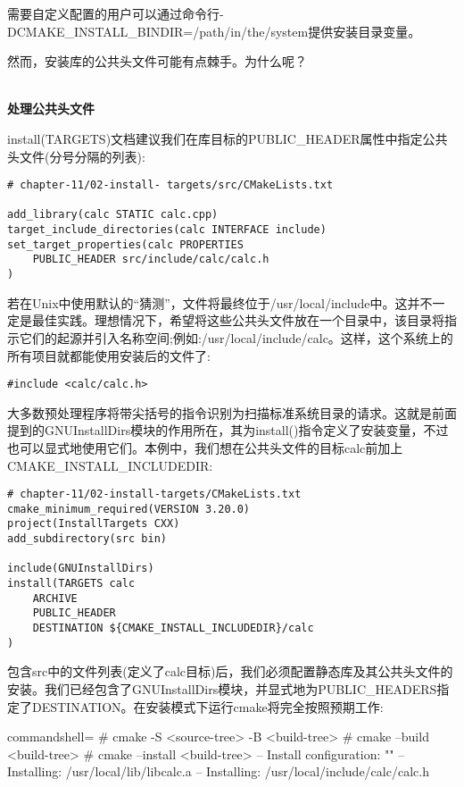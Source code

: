 需要自定义配置的用户可以通过命令行-DCMAKE\_INSTALL\_BINDIR=/path/in/the/system提供安装目录变量。

然而，安装库的公共头文件可能有点棘手。为什么呢？

\hspace*{\fill} \\ %
\noindent
\textbf{处理公共头文件}

install(TARGETS)文档建议我们在库目标的PUBLIC\_HEADER属性中指定公共头文件(分号分隔的列表):

\begin{lstlisting}[style=styleCMake]
# chapter-11/02-install- targets/src/CMakeLists.txt

add_library(calc STATIC calc.cpp)
target_include_directories(calc INTERFACE include)
set_target_properties(calc PROPERTIES
	PUBLIC_HEADER src/include/calc/calc.h
)
\end{lstlisting}

若在Unix中使用默认的“猜测”，文件将最终位于/usr/local/include中。这并不一定是最佳实践。理想情况下，希望将这些公共头文件放在一个目录中，该目录将指示它们的起源并引入名称空间;例如:/usr/local/include/calc。这样，这个系统上的所有项目就都能使用安装后的文件了:

\begin{lstlisting}[style=styleCXX]
#include <calc/calc.h>
\end{lstlisting}

大多数预处理程序将带尖括号的指令识别为扫描标准系统目录的请求。这就是前面提到的GNUInstallDirs模块的作用所在，其为install()指令定义了安装变量，不过也可以显式地使用它们。本例中，我们想在公共头文件的目标calc前加上CMAKE\_INSTALL\_INCLUDEDIR:

\begin{lstlisting}[style=styleCMake]
# chapter-11/02-install-targets/CMakeLists.txt
cmake_minimum_required(VERSION 3.20.0)
project(InstallTargets CXX)
add_subdirectory(src bin)

include(GNUInstallDirs)
install(TARGETS calc
	ARCHIVE
	PUBLIC_HEADER
	DESTINATION ${CMAKE_INSTALL_INCLUDEDIR}/calc
)
\end{lstlisting}

包含src中的文件列表(定义了calc目标)后，我们必须配置静态库及其公共头文件的安装。我们已经包含了GNUInstallDirs模块，并显式地为PUBLIC\_HEADERS指定了DESTINATION。在安装模式下运行cmake将完全按照预期工作:

\begin{tcblisting}{commandshell={}}
# cmake -S <source-tree> -B <build-tree>
# cmake --build <build-tree>
# cmake --install <build-tree>
-- Install configuration: ""
-- Installing: /usr/local/lib/libcalc.a
-- Installing: /usr/local/include/calc/calc.h
\end{tcblisting}

